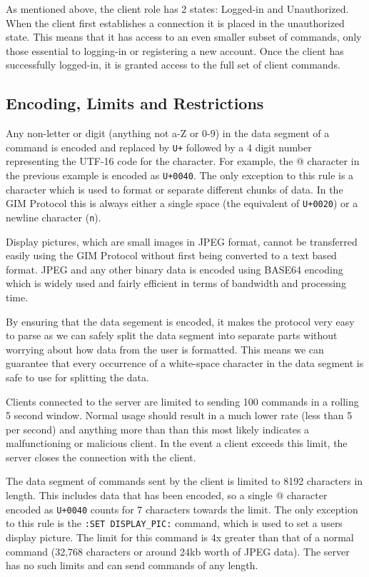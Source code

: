 As mentioned above, the client role has 2 states: Logged-in and Unauthorized. When the client first establishes a connection it is placed in the unauthorized state. This means that it has access to an even smaller subset of commands, only those essential to logging-in or registering a new account. Once the client has successfully logged-in, it is granted access to the full set of client commands.


\subsection{Encoding, Limits and Restrictions}
\label{encoding}

Any non-letter or digit (anything not a-Z or 0-9) in the data segment of a command is encoded and replaced by \texttt{\SLASH U+} followed by a 4 digit number representing the UTF-16 code for the character. For example, the @ character in the previous example is encoded as \texttt{\SLASH U+0040}. The only exception to this rule is a character which is used to format or separate different chunks of data. In the GIM Protocol this is always either a single space (the equivalent of \texttt{\SLASH U+0020}) or a newline character (\texttt{\SLASH n}).

Display pictures, which are small images in JPEG format, cannot be transferred easily using the GIM Protocol without first being converted to a text based format. JPEG and any other binary data is encoded using BASE64 encoding which is widely used and fairly efficient in terms of bandwidth and processing time.

By ensuring that the data segement is encoded, it makes the protocol very easy to parse as we can safely split the data segment into separate parts without worrying about how data from the user is formatted. This means we can guarantee that every occurrence of a white-space character in the data segment is safe to use for splitting the data.

Clients connected to the server are limited to sending 100 commands in a rolling 5 second window. Normal usage should result in a much lower rate (less than 5 per second) and anything more than than this most likely indicates a malfunctioning or malicious client. In the event a client exceeds this limit, the server closes the connection with the client. %

The data segment of commands sent by the client is limited to 8192 characters in length. This includes data that has been encoded, so a single @ character encoded as \texttt{\SLASH U+0040} counts for 7 characters towards the limit. The only exception to this rule is the \texttt{:SET DISPLAY\_PIC:} command, which is used to set a users display picture. The limit for this command is 4x greater than that of a normal command (32,768 characters or around 24kb worth of JPEG data). The server has no such limits and can send commands of any length.

